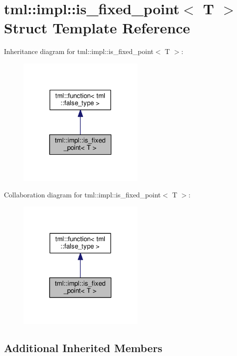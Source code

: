 \hypertarget{structtml_1_1impl_1_1is__fixed__point}{\section{tml\+:\+:impl\+:\+:is\+\_\+fixed\+\_\+point$<$ T $>$ Struct Template Reference}
\label{structtml_1_1impl_1_1is__fixed__point}
}


Inheritance diagram for tml\+:\+:impl\+:\+:is\+\_\+fixed\+\_\+point$<$ T $>$\+:
\nopagebreak
\begin{figure}[H]
\begin{center}
\leavevmode
\includegraphics[width=174pt]{structtml_1_1impl_1_1is__fixed__point__inherit__graph}
\end{center}
\end{figure}


Collaboration diagram for tml\+:\+:impl\+:\+:is\+\_\+fixed\+\_\+point$<$ T $>$\+:
\nopagebreak
\begin{figure}[H]
\begin{center}
\leavevmode
\includegraphics[width=174pt]{structtml_1_1impl_1_1is__fixed__point__coll__graph}
\end{center}
\end{figure}
\subsection*{Additional Inherited Members}


